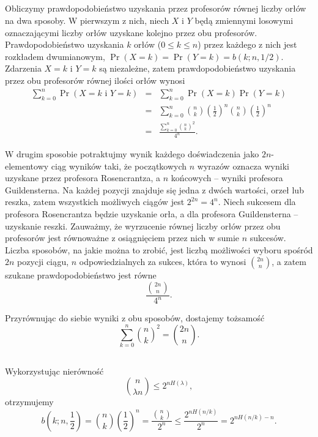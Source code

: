 \subsection{} %
Obliczymy prawdopodobieństwo uzyskania przez profesorów równej liczby orłów na dwa sposoby. W pierwszym z nich, niech $X$ i $Y$ będą zmiennymi losowymi oznaczającymi liczby orłów uzyskane kolejno przez obu profesorów. Prawdopodobieństwo uzyskania $k$ orłów ($0\le k\le n$) przez każdego z nich jest rozkładem dwumianowym, $\Pr(X=k) = \Pr(Y=k) = b(k;n,1/2)$. Zdarzenia $X=k$ i $Y=k$ są niezależne, zatem prawdopodobieństwo uzyskania przez obu profesorów równej ilości orłów wynosi
\begin{eqnarray*}
	\sum_{k=0}^n\Pr(X=k\mbox{ i }Y=k) &=& \sum_{k=0}^n\Pr(X=k)\Pr(Y=k) \\
	&=& \sum_{k=0}^n\binom{n}{k}\left(\frac{1}{2}\right)^n\binom{n}{k}\left(\frac{1}{2}\right)^n \\
	&=& \frac{\sum_{k=0}^n\binom{n}{k}^2}{4^n}.
\end{eqnarray*}

W drugim sposobie potraktujmy wynik każdego doświadczenia jako $2n$-elementowy ciąg wyników taki, że początkowych $n$ wyrazów oznacza wyniki uzyskane przez profesora Rosencrantza, a $n$ końcowych -- wyniki profesora Guildensterna. Na każdej pozycji znajduje się jedna z dwóch wartości, orzeł lub reszka, zatem wszystkich możliwych ciągów jest $2^{2n}=4^n$. Niech sukcesem dla profesora Rosencrantza będzie uzyskanie orła, a dla profesora Guildensterna -- uzyskanie reszki. Zauważmy, że wyrzucenie równej liczby orłów przez obu profesorów jest równoważne z osiągnięciem przez nich w sumie $n$ sukcesów. Liczba sposobów, na jakie można to zrobić, jest liczbą możliwości wyboru spośród $2n$ pozycji ciągu, $n$ odpowiedzialnych za sukces, która to wynosi $\binom{2n}{n}$, a zatem szukane prawdopodobieństwo jest równe
\[
	\frac{\binom{2n}{n}}{4^n}.
\]

Przyrównując do siebie wyniki z obu sposobów, dostajemy tożsamość
\[
	\sum_{k=0}^n\binom{n}{k}^2 = \binom{2n}{n}.
\]

\subsection{} %
Wykorzystując nierówność
\[
	\binom{n}{\lambda n}\le 2^{nH(\lambda)},
\]
otrzymujemy
\[
	b\left(k;n,\frac{1}{2}\right) = \binom{n}{k}\left(\frac{1}{2}\right)^n = \frac{\binom{n}{k}}{2^n}\le\frac{2^{nH(n/k)}}{2^n} = 2^{nH(n/k)-n}.
\]

